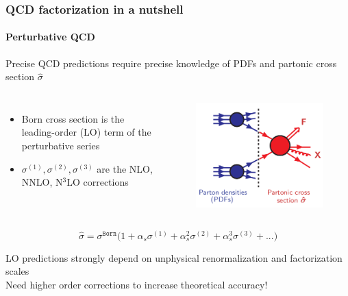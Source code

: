 \documentclass[aspectratio=43]{beamer}
\begin{document}
\begin{frame}

	\frametitle{QCD factorization in a nutshell}
	\framesubtitle{Perturbative QCD}
	
	\footnotesize Precise QCD predictions require precise knowledge of {\color{blue}PDFs} and {\color{red} partonic cross section $\hat{\sigma}$}
	\begin{columns}
		
		
		\begin{itemize}
			\item \footnotesize Born cross section is the leading-order (LO) term of the perturbative series
			\item \footnotesize $\sigma^{(1)}, \sigma^{(2)}, \sigma^{(3)}$ are the NLO, NNLO, N$^{3}$LO corrections
		\end{itemize}
		
		\begin{figure}[!htb]
			\includegraphics[width = 4 cm]{plots/section1/factorization_3.png}
		\end{figure}
	
	\end{columns}

	\vspace{0.5cm}	
	
	\begin{equation}
		\hat{\sigma} = \sigma^{\texttt{Born}} \Big( 1 +
		\alpha_{s} \sigma^{(1)} + 
		\alpha_{s}^{2} \sigma^{(2)} + 
		\alpha_{s}^{3} \sigma^{(3)} + ... \Big) \nonumber
	\end{equation}
	
	\footnotesize LO predictions strongly depend on unphysical renormalization and factorization scales \\
	{\color{red}Need higher order corrections to increase theoretical accuracy!}

\end{frame}

\begin{frame}


\end{frame}
\end{document}
